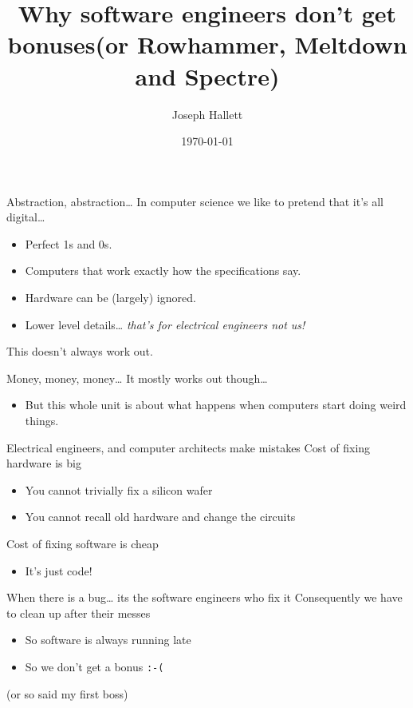 \documentclass[9pt,aspectratio=169]{beamer}
\author{Joseph Hallett}
\date{\today}
\title{Why software engineers don't get bonuses\newline{}(or Rowhammer, Meltdown and Spectre)}
\begin{document}
\maketitle

\begin{frame}[label={sec:org3d300c2}]{Abstraction, abstraction\ldots{}}
In computer science we like to pretend that it's all digital\ldots{}
\begin{itemize}
\item Perfect 1s and 0s.
\item Computers that work exactly how the specifications say.
\item Hardware can be (largely) ignored.
\item Lower level details\ldots{} \emph{that's for electrical engineers not us!}
\end{itemize}

\begin{block}{This doesn't always work out.}
\end{block}
\end{frame}

\begin{frame}[label={sec:org7a24630},fragile]{Money, money, money\ldots{}}
 It mostly works out though\ldots{}
\begin{itemize}
\item But this whole unit is about what happens when computers start doing weird things.
\end{itemize}

\begin{block}{Electrical engineers, and computer architects make mistakes}
Cost of fixing hardware is big
\begin{itemize}
\item You cannot trivially fix a silicon wafer
\item You cannot recall old hardware and change the circuits
\end{itemize}

Cost of fixing software is cheap
\begin{itemize}
\item It's just code!
\end{itemize}
\end{block}

\begin{block}{When there is a bug\ldots{} its the software engineers who fix it}
Consequently we have to clean up after their messes
\begin{itemize}
\item So software is always running late
\item So we don't get a bonus \texttt{:-(}

\vfill
\footnotesize
\end{itemize}
(or so said my first boss)
\end{block}
\end{frame}
\end{document}
